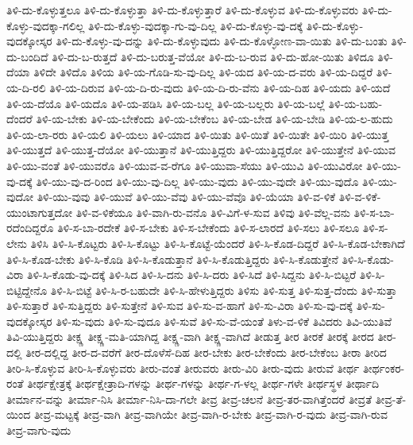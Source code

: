 ತಿಳಿ-ದು-ಕೊಳ್ಳುತ್ತಲೂ
ತಿಳಿ-ದು-ಕೊಳ್ಳುತ್ತಾ
ತಿಳಿ-ದು-ಕೊಳ್ಳುತ್ತಾರೆ
ತಿಳಿ-ದು-ಕೊಳ್ಳುವ
ತಿಳಿ-ದು-ಕೊಳ್ಳುವರು
ತಿಳಿ-ದು-ಕೊಳ್ಳು-ವುದಕ್ಕಾ-ಗಲಿಲ್ಲ
ತಿಳಿ-ದು-ಕೊಳ್ಳು-ವುದಕ್ಕಾ-ಗು-ವು-ದಿಲ್ಲ
ತಿಳಿ-ದು-ಕೊಳ್ಳು-ವು-ದಕ್ಕೆ
ತಿಳಿ-ದು-ಕೊಳ್ಳು-ವುದಕ್ಕೋಸ್ಕರ
ತಿಳಿ-ದು-ಕೊಳ್ಳು-ವು-ದನ್ನು
ತಿಳಿ-ದು-ಕೊಳ್ಳುವುದು
ತಿಳಿ-ದು-ಕೊಳ್ಳೋಣ-ವಾ-ಯಿತು
ತಿಳಿ-ದು-ಬಂತು
ತಿಳಿ-ದು-ಬಂದಿದೆ
ತಿಳಿ-ದು-ಬ-ರುತ್ತದೆ
ತಿಳಿ-ದು-ಬರುತ್ತ-ವೆಯೋ
ತಿಳಿ-ದು-ಬ-ರುವ
ತಿಳಿ-ದು-ಹೋ-ಯಿತು
ತಿಳಿದೂ
ತಿಳಿ-ದೆಯಾ
ತಿಳಿದೇ
ತಿಳಿದೊ
ತಿಳಿಯ
ತಿಳಿ-ಯ-ಗೊಡಿ-ಸು-ವು-ದಿಲ್ಲ
ತಿಳಿ-ಯದ
ತಿಳಿ-ಯ-ದ-ವರು
ತಿಳಿ-ಯ-ದಿದ್ದರೆ
ತಿಳಿ-ಯ-ದಿ-ರಲಿ
ತಿಳಿ-ಯ-ದಿರುವ
ತಿಳಿ-ಯ-ದಿ-ರು-ವುದು
ತಿಳಿ-ಯ-ದಿ-ರು-ವೆನು
ತಿಳಿ-ಯ-ದಿಹ
ತಿಳಿ-ಯದು
ತಿಳಿ-ಯದೆ
ತಿಳಿ-ಯ-ದೆಯೊ
ತಿಳಿ-ಯದೊ
ತಿಳಿ-ಯ-ಪಡಿಸಿ
ತಿಳಿ-ಯ-ಬಲ್ಲ
ತಿಳಿ-ಯ-ಬಲ್ಲರು
ತಿಳಿ-ಯ-ಬಲ್ಲೆ
ತಿಳಿ-ಯ-ಬಹು-ದೆಂದರೆ
ತಿಳಿ-ಯ-ಬೇಕು
ತಿಳಿ-ಯ-ಬೇಕೆಂದು
ತಿಳಿ-ಯ-ಬೇಕೆಂಬ
ತಿಳಿ-ಯ-ಬೇಡ
ತಿಳಿ-ಯ-ಬೇಡಿ
ತಿಳಿ-ಯ-ಲ-ಹುದು
ತಿಳಿ-ಯ-ಲಾ-ರರು
ತಿಳಿ-ಯಲಿ
ತಿಳಿ-ಯಲು
ತಿಳಿ-ಯಾದ
ತಿಳಿ-ಯಿತು
ತಿಳಿ-ಯಿತೆ
ತಿಳಿ-ಯಿತೇ
ತಿಳಿ-ಯಿರಿ
ತಿಳಿ-ಯುತ್ತ
ತಿಳಿ-ಯುತ್ತದೆ
ತಿಳಿ-ಯುತ್ತ-ದೆಯೋ
ತಿಳಿ-ಯುತ್ತಾನೆ
ತಿಳಿ-ಯುತ್ತಿದ್ದರು
ತಿಳಿ-ಯುತ್ತಿದ್ದರೋ
ತಿಳಿ-ಯುತ್ತೇನೆ
ತಿಳಿ-ಯುವ
ತಿಳಿ-ಯು-ವಂತೆ
ತಿಳಿ-ಯುವರೊ
ತಿಳಿ-ಯುವ-ವ-ರೆಗೂ
ತಿಳಿ-ಯುವಾ-ಸೆಯು
ತಿಳಿ-ಯುವಿ
ತಿಳಿ-ಯುವಿರೋ
ತಿಳಿ-ಯು-ವು-ದಕ್ಕೆ
ತಿಳಿ-ಯು-ವು-ದ-ರಿಂದ
ತಿಳಿ-ಯು-ವು-ದಿಲ್ಲ
ತಿಳಿ-ಯು-ವುದು
ತಿಳಿ-ಯು-ವುದೇ
ತಿಳಿ-ಯು-ವುದೊ
ತಿಳಿ-ಯು-ವುದೋ
ತಿಳಿ-ಯು-ವುವು
ತಿಳಿ-ಯುವೆ
ತಿಳಿ-ಯು-ವೆವು
ತಿಳಿ-ಯು-ವೆವೊ
ತಿಳಿ-ಯೆಯಾ
ತಿಳಿ-ವ-ಳಿಕೆ
ತಿಳಿ-ವ-ಳಿಕೆ-ಯುಂಟಾಗುತ್ತದೋ
ತಿಳಿ-ವ-ಳಿಕೆಯೂ
ತಿಳಿ-ವಾಗಿ-ರು-ವನೊ
ತಿಳಿ-ವಿಗೆ-ಳ-ಸುವ
ತಿಳಿವು
ತಿಳಿ-ವೆಲ್ಲ-ವನು
ತಿಳಿ-ಸ-ಬಾ-ರದೆಂದಿದ್ದರೊ
ತಿಳಿ-ಸ-ಬಾ-ರದೇಕೆ
ತಿಳಿ-ಸ-ಬೇಕು
ತಿಳಿ-ಸ-ಬೇಕೆಂದು
ತಿಳಿ-ಸ-ಲಾರದೆ
ತಿಳಿ-ಸಲು
ತಿಳಿ-ಸಲೂ
ತಿಳಿ-ಸ-ಲೇನು
ತಿಳಿಸಿ
ತಿಳಿ-ಸಿ-ಕೊಟ್ಟರು
ತಿಳಿ-ಸಿ-ಕೊಟ್ಟು
ತಿಳಿ-ಸಿ-ಕೊಟ್ಟೆ-ಯೆಂದರೆ
ತಿಳಿ-ಸಿ-ಕೊಡ-ದಿದ್ದರೆ
ತಿಳಿ-ಸಿ-ಕೊಡ-ಬೇಕಾಗಿದೆ
ತಿಳಿ-ಸಿ-ಕೊಡ-ಬೇಕು
ತಿಳಿ-ಸಿ-ಕೊಡಿ
ತಿಳಿ-ಸಿ-ಕೊಡುತ್ತಾನೆ
ತಿಳಿ-ಸಿ-ಕೊಡುತ್ತಿದ್ದರು
ತಿಳಿ-ಸಿ-ಕೊಡುತ್ತೇನೆ
ತಿಳಿ-ಸಿ-ಕೊಡು-ವಿರಾ
ತಿಳಿ-ಸಿ-ಕೊಡು-ವು-ದಕ್ಕೆ
ತಿಳಿ-ಸಿದ
ತಿಳಿ-ಸಿ-ದನು
ತಿಳಿ-ಸಿ-ದರು
ತಿಳಿ-ಸಿದೆ
ತಿಳಿ-ಸಿದ್ದನು
ತಿಳಿ-ಸಿ-ಬಿಟ್ಟರೆ
ತಿಳಿ-ಸಿ-ಬಿಟ್ಟಿದ್ದೇನೊ
ತಿಳಿ-ಸಿ-ಬಿಟ್ಟೆ
ತಿಳಿ-ಸಿ-ರ-ಬಹುದೇ
ತಿಳಿ-ಸಿ-ಹೇಳುತ್ತಿದ್ದರು
ತಿಳಿಸು
ತಿಳಿ-ಸುತ್ತ
ತಿಳಿ-ಸುತ್ತ-ದೆಂದು
ತಿಳಿ-ಸುತ್ತಾ
ತಿಳಿ-ಸುತ್ತಾರೆ
ತಿಳಿ-ಸುತ್ತಿದ್ದರು
ತಿಳಿ-ಸುತ್ತೇನೆ
ತಿಳಿ-ಸುವ
ತಿಳಿ-ಸು-ವ-ಹಾಗೆ
ತಿಳಿ-ಸು-ವಿರಾ
ತಿಳಿ-ಸು-ವು-ದಕ್ಕೆ
ತಿಳಿ-ಸು-ವುದಕ್ಕೋಸ್ಕರ
ತಿಳಿ-ಸು-ವುದು
ತಿಳಿ-ಸು-ವುದೂ
ತಿಳಿ-ಸುವೆ
ತಿಳಿ-ಸು-ವೆ-ಯಂತೆ
ತಿಳು-ವ-ಳಿಕೆ
ತಿವಿದರು
ತಿವಿ-ಯುತಿವೆ
ತಿವಿ-ಯುತ್ತಿದ್ದರು
ತೀಕ್ಷ್ಣ
ತೀಕ್ಷ್ಣ-ಮತಿ-ಯಾಗಿದ್ದ
ತೀಕ್ಷ್ಣ-ವಾಗಿ
ತೀಕ್ಷ್ಣ-ವಾಗಿದೆ
ತೀಡುತ್ತ
ತೀರ
ತೀರಕೆ
ತೀರಕ್ಕೆ
ತೀರದ
ತೀರ-ದಲ್ಲಿ
ತೀರ-ದಲ್ಲಿದ್ದ
ತೀರ-ದ-ವರೆಗೆ
ತೀರ-ದೊಳೆಸೆ-ದಿಹ
ತೀರ-ಬೇಕು
ತೀರ-ಬೇಕೆಂದು
ತೀರ-ಬೇಕೆಂಬ
ತೀರಾ
ತೀರಿದ
ತೀರಿ-ಸಿ-ಕೊಳ್ಳುವ
ತೀರಿ-ಸಿ-ಕೊಳ್ಳುವರು
ತೀರು-ವಂತೆ
ತೀರುವರು
ತೀರು-ವಿರಿ
ತೀರು-ವುದು
ತೀರುವೆ
ತೀರ್ಥ
ತೀರ್ಥಂಕರ-ರಂತೆ
ತೀರ್ಥಕ್ಷೇತ್ರಕ್ಕೆ
ತೀರ್ಥಕ್ಷೇತ್ರಾದಿ-ಗಳನ್ನು
ತೀರ್ಥ-ಗಳನ್ನು
ತೀರ್ಥ-ಗ-ಳಲ್ಲ
ತೀರ್ಥ-ಗಳೇ
ತೀರ್ಥಸ್ಥಳ
ತೀರ್ಥಾದಿ
ತೀರ್ಮಾನ-ವನ್ನು
ತೀರ್ಮಾ-ನಿಸಿ
ತೀರ್ಮಾ-ನಿಸಿ-ದಾ-ಗಲೇ
ತೀವ್ರ
ತೀವ್ರ-ಚಲನೆ
ತೀವ್ರ-ತರ-ವಾಗಿತ್ತೆಂದರೆ
ತೀವ್ರತೆ
ತೀವ್ರ-ತೆ-ಯಿಂದ
ತೀವ್ರ-ಮಟ್ಟಕ್ಕೆ
ತೀವ್ರ-ವಾಗಿ
ತೀವ್ರ-ವಾಗಿಯೇ
ತೀವ್ರ-ವಾಗಿ-ರ-ಬೇಕು
ತೀವ್ರ-ವಾಗಿ-ರ-ವುದು
ತೀವ್ರ-ವಾಗಿ-ರುವ
ತೀವ್ರ-ವಾಗು-ವುದು

